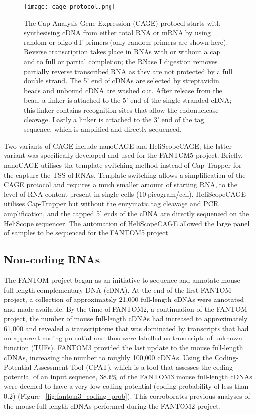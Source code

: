 \begin{figure}[!ht]
   \centering
   \texttt{[image: cage\_protocol.png]}
   \caption[Cap Analysis Gene Expression protocol]{The Cap Analysis Gene Expression (CAGE) protocol starts with synthesising cDNA from either total RNA or mRNA by using random or oligo dT primers (only random primers are shown here). Reverse transcription takes place in RNAs with or without a cap and to full or partial completion; the RNase I digestion removes partially reverse transcribed RNA as they are not protected by a full double strand. The 5' end of cDNAs are selected by streptavidin beads and unbound cDNA are washed out. After release from the bead, a linker is attached to the 5' end of the single-stranded cDNA; this linker contains recognition sites that allow the endonuclease cleavage. Lastly a linker is attached to the 3' end of the tag sequence, which is amplified and directly sequenced.}
   \label{fig:cage_protocol}
\end{figure}

Two variants of CAGE include nanoCAGE\cite{pmid20543846} and HeliScopeCAGE\cite{pmid21596820}; the latter variant was specifically developed and used for the FANTOM5 project. Briefly, nanoCAGE utilises the template-switching method\cite{pmid11314272} instead of Cap-Trapper for the capture the TSS of RNAs. Template-switching allows a simplification of the CAGE protocol and requires a much smaller amount of starting RNA, to the level of RNA content present in single cells (10 picogram/cell). HeliScopeCAGE utilises Cap-Trapper but without the enzymatic tag cleavage and PCR amplification, and the capped 5' ends of the cDNA are directly sequenced on the HeliScope sequencer. The automation of HeliScopeCAGE\cite{pmid22303458} allowed the large panel of samples to be sequenced for the FANTOM5 project.

\subsection{Non-coding RNAs}

The FANTOM project began as an initiative to sequence and annotate mouse full-length complementary DNA (cDNA)\cite{pmid11217851}. At the end of the first FANTOM project, a collection of approximately 21,000 full-length cDNAs were annotated and made available. By the time of FANTOM2, a continuation of the FANTOM project, the number of mouse full-length cDNAs had increased to approximately 61,000 and revealed a transcriptome that was dominated by transcripts that had no apparent coding potential and thus were labelled as transcripts of unknown function (TUFs)\cite{pmid12466851}. FANTOM3 provided the last update to the mouse full-length cDNAs, increasing the number to roughly 100,000 cDNAs\cite{pmid16141072}. Using the Coding-Potential Assessment Tool (CPAT)\cite{pmid23335781}, which is a tool that assesses the coding potential of an input sequence, 38.6\% of the FANTOM3 mouse full-length cDNAs were deemed to have a very low coding potential (coding probability of less than 0.2) (Figure ~\ref{fig:fantom3_coding_prob}). This corroborates previous analyses of the mouse full-length cDNAs performed during the FANTOM2 project.

